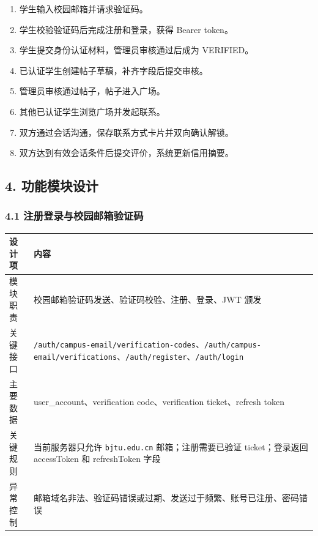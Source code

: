 \documentclass[
]{ctexart}
\providecommand{\tightlist}{%
  \setlength{\itemsep}{0pt}\setlength{\parskip}{0pt}}
\begin{document}
\begin{enumerate}
\def\labelenumi{\arabic{enumi}.}
\tightlist
\item
  学生输入校园邮箱并请求验证码。
\item
  学生校验验证码后完成注册和登录，获得 Bearer token。
\item
  学生提交身份认证材料，管理员审核通过后成为 VERIFIED。
\item
  已认证学生创建帖子草稿，补齐字段后提交审核。
\item
  管理员审核通过帖子，帖子进入广场。
\item
  其他已认证学生浏览广场并发起联系。
\item
  双方通过会话沟通，保存联系方式卡片并双向确认解锁。
\item
  双方达到有效会话条件后提交评价，系统更新信用摘要。
\end{enumerate}

\hypertarget{ux529fux80fdux6a21ux5757ux8bbeux8ba1}{%
\subsection{4.
功能模块设计}\label{ux529fux80fdux6a21ux5757ux8bbeux8ba1}}

\hypertarget{ux6ce8ux518cux767bux5f55ux4e0eux6821ux56edux90aeux7bb1ux9a8cux8bc1ux7801}{%
\subsubsection{4.1
注册登录与校园邮箱验证码}\label{ux6ce8ux518cux767bux5f55ux4e0eux6821ux56edux90aeux7bb1ux9a8cux8bc1ux7801}}

\begin{longtable}[]{@{}
  >{\raggedright\arraybackslash}p{}
  >{\raggedright\arraybackslash}p{}@{}}
\toprule
设计项 & 内容 \\
\midrule
\endhead
模块职责 & 校园邮箱验证码发送、验证码校验、注册、登录、JWT 颁发 \\
关键接口 &
\texttt{/auth/campus-email/verification-codes}、\texttt{/auth/campus-email/verifications}、\texttt{/auth/register}、\texttt{/auth/login} \\
主要数据 & user\_account、verification code、verification
ticket、refresh token \\
关键规则 & 当前服务器只允许 \texttt{bjtu.edu.cn} 邮箱；注册需要已验证
ticket；登录返回 accessToken 和 refreshToken 字段 \\
异常控制 &
邮箱域名非法、验证码错误或过期、发送过于频繁、账号已注册、密码错误 \\
\bottomrule
\end{longtable}
\end{document}
